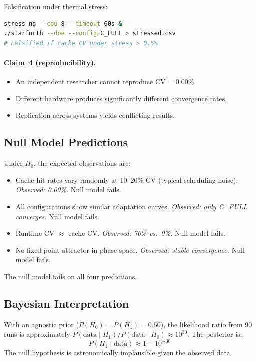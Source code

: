 Falsification under thermal stress:
\begin{lstlisting}[language=bash]
stress-ng --cpu 8 --timeout 60s &
./starforth --doe --config=C_FULL > stressed.csv
# Falsified if cache CV under stress > 0.5%
\end{lstlisting}

\paragraph{Claim~4 (reproducibility).}
\begin{itemize}
  \item An independent researcher cannot reproduce CV = 0.00\%.
  \item Different hardware produces significantly different convergence rates.
  \item Replication across systems yields conflicting results.
\end{itemize}

\subsection{Null Model Predictions}

Under $H_0$, the expected observations are:
\begin{itemize}
  \item Cache hit rates vary randomly at 10--20\% CV (typical scheduling
    noise). \emph{Observed: 0.00\%.} Null model fails.
  \item All configurations show similar adaptation curves. \emph{Observed:
    only C\_FULL converges.} Null model fails.
  \item Runtime CV $\approx$ cache CV. \emph{Observed: 70\% vs.\ 0\%.}
    Null model fails.
  \item No fixed-point attractor in phase space. \emph{Observed: stable
    convergence.} Null model fails.
\end{itemize}

The null model fails on all four predictions.

\subsection{Bayesian Interpretation}

With an agnostic prior ($P(H_0) = P(H_1) = 0.50$), the likelihood ratio
from 90 runs is approximately $P(\text{data} \mid H_1) / P(\text{data}
\mid H_0) \approx 10^{30}$. The posterior is:
\[
  P(H_1 \mid \text{data}) \approx 1 - 10^{-30}
\]
The null hypothesis is astronomically implausible given the observed data.

